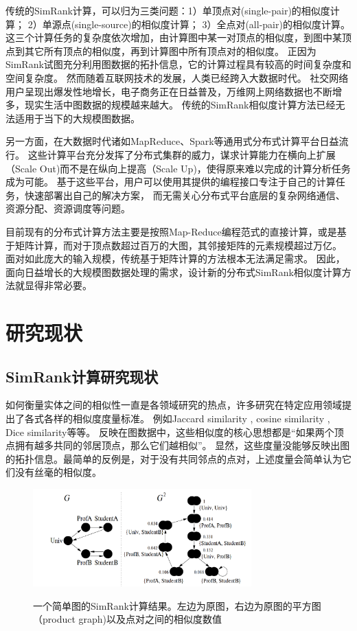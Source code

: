 \documentclass[master]{njuthesis}
\begin{document}
传统的SimRank计算，可以归为三类问题：1）单顶点对(single-pair)的相似度计算；
2）单源点(single-source)的相似度计算； 3）全点对(all-pair)的相似度计算。
这三个计算任务的复杂度依次增加，由计算图中某一对顶点的相似度，到图中某顶点到其它所有顶点的相似度，再到计算图中所有顶点对的相似度。
正因为SimRank试图充分利用图数据的拓扑信息，它的计算过程具有较高的时间复杂度和空间复杂度。
然而随着互联网技术的发展，人类已经跨入大数据时代。
社交网络用户呈现出爆发性地增长，电子商务正在日益普及，万维网上网络数据也不断增多，现实生活中图数据的规模越来越大。
传统的SimRank相似度计算方法已经无法适用于当下的大规模图数据。

另一方面，在大数据时代诸如MapReduce\cite{DBLP:conf/osdi/DeanG04}、Spark\cite{DBLP:conf/hotcloud/ZahariaCFSS10}等通用式分布式计算平台日益流行。
这些计算平台充分发挥了分布式集群的威力，谋求计算能力在横向上扩展（Scale Out)而不是在纵向上提高（Scale Up)，使得原来难以完成的计算分析任务成为可能。
基于这些平台，用户可以使用其提供的编程接口专注于自己的计算任务，快速部署出自己的解决方案，
而无需关心分布式平台底层的复杂网络通信、资源分配、资源调度等问题。

目前现有的分布式计算方法主要是按照Map-Reduce编程范式的直接计算，或是基于矩阵计算，而对于顶点数超过百万的大图，其邻接矩阵的元素规模超过万亿。
面对如此庞大的输入规模，传统基于矩阵计算的方法根本无法满足需求。
因此，面向日益增长的大规模图数据处理的需求，设计新的分布式SimRank相似度计算方法就显得非常必要。


\section{研究现状}
\subsection{SimRank计算研究现状}
如何衡量实体之间的相似性一直是各领域研究的热点，许多研究在特定应用领域提出了各式各样的相似度度量标准。
例如Jaccard similarity \cite{jaccard1901etude}, cosine similarity \cite{baeza1999modern}, Dice similarity\cite{dice1945measures}等等。
反映在图数据中，这些相似度的核心思想都是“如果两个顶点拥有越多共同的邻居顶点，那么它们越相似”。
显然，这些度量没能够反映出图的拓扑信息。最简单的反例是，对于没有共同邻点的点对，上述度量会简单认为它们没有丝毫的相似度。
\begin{figure}[h]
  \centering
  \includegraphics[width= 0.75\textwidth]{figure/simrank.png}\\
  \caption{一个简单图的SimRank计算结果。左边为原图，右边为原图的平方图（product graph)以及点对之间的相似度数值}
  \label{fig:simrank_example}
\end{figure}
\end{document}
